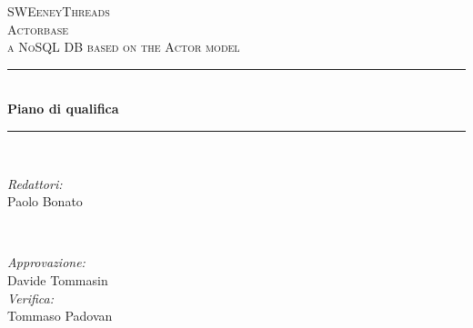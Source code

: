 \documentclass[a4paper]{article}
\begin{document}
	\begin{titlepage}
		\newcommand{\HRule}{\rule{\linewidth}{0.5mm}} 
		\center  
		
		\textsc{\LARGE SWEeneyThreads}\\[1.5cm] 
		\textsc{\Large Actorbase}\\[0.5cm] 
		\textsc{\large a NoSQL DB based on the Actor model}\\[0.5cm]
		
		
		\HRule \\[0.4cm]
		{ \huge \bfseries Piano di qualifica}\\[0.4cm] 
		\HRule \\[1.5cm]
		
		\begin{minipage}{0.4\textwidth}
			\begin{flushleft} \large
				\emph{Redattori:}\\
				Paolo Bonato\\
			\end{flushleft}
		\end{minipage}
		~
		\begin{minipage}{0.4\textwidth}
			\begin{flushright} \large
				\emph{Approvazione:} \\
                Davide Tommasin \\
				\emph{Verifica:} \\
                Tommaso Padovan \\
			\end{flushright}
		\end{minipage}
		

\end{titlepage}
\end{document}
